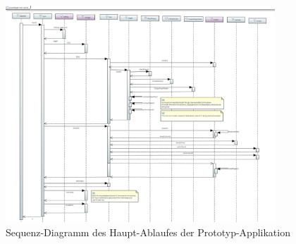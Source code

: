 \begin{figure}[H]
    \centering
    \includegraphics[width=0.9\textwidth]{img/prototype_sequence_diagram.png}
    \caption{Sequenz-Diagramm des Haupt-Ablaufes der
        Prototyp-Applikation}\label{fig:prototype:sequence:diagram}
\end{figure}
